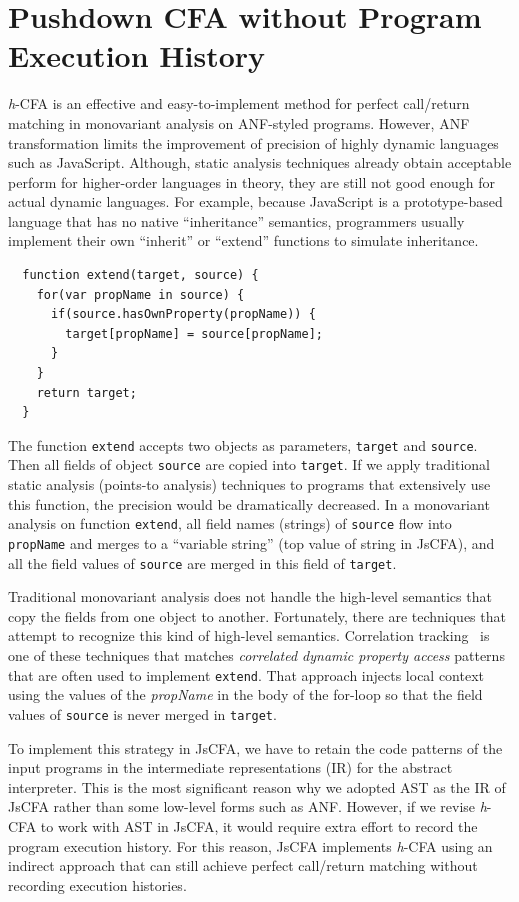 \documentclass[12pt]{report}
\begin{document}
\section{Pushdown CFA without Program Execution History}
\label{sub:pushdown-jscfa}
\textit{h}-CFA is an effective and easy-to-implement method for perfect call/return matching in monovariant analysis on ANF-styled programs. However, ANF transformation limits the improvement of precision of highly dynamic languages such as JavaScript.
Although, static analysis techniques already obtain acceptable perform for higher-order languages in theory, they are still not good enough for actual dynamic languages. For example, because JavaScript is a prototype-based language that has no native ``inheritance'' semantics, programmers usually implement their own ``inherit'' or ``extend'' functions to simulate inheritance.
\begin{lstlisting}
  function extend(target, source) {
    for(var propName in source) {
      if(source.hasOwnProperty(propName)) {
        target[propName] = source[propName];
      }
    }
    return target;
  }
\end{lstlisting}
The function \verb|extend| accepts two objects as parameters, \verb|target| and \verb|source|.
Then all fields of object \verb|source| are copied into \verb|target|. If we apply traditional static analysis (points-to analysis) techniques to programs that extensively use this function, the precision would be dramatically decreased.
In a monovariant analysis on function \verb|extend|, all field names (strings) of \verb|source| flow into \verb|propName| and merges to a ``variable string'' (top value of string in JsCFA), and all the field values of \verb|source| are merged in this field of \verb|target|.

Traditional monovariant analysis does not handle the high-level semantics that copy the fields from one object to another.
Fortunately, there are techniques that attempt to recognize this kind of high-level semantics.
Correlation tracking~\cite{sridharan2012correlation}
is one of these techniques that matches \emph{correlated dynamic property access} patterns that are often used to implement \verb|extend|.
That approach injects local context using the values of the {\em propName} in the body of the for-loop so that the
field values of \verb|source| is never merged in \verb|target|.

To implement this strategy in JsCFA, we have to retain the code patterns of the input programs in the intermediate representations (IR) for the abstract interpreter.
This is the most significant reason why we adopted AST as the IR of JsCFA rather than some low-level forms such as ANF\@.
However, if we revise \textit{h}-CFA to work with AST in JsCFA\@,
it would require extra effort to record the program execution history.
For this reason, JsCFA implements \textit{h}-CFA using an indirect approach that can still achieve perfect call/return matching without recording execution histories.
\end{document}
